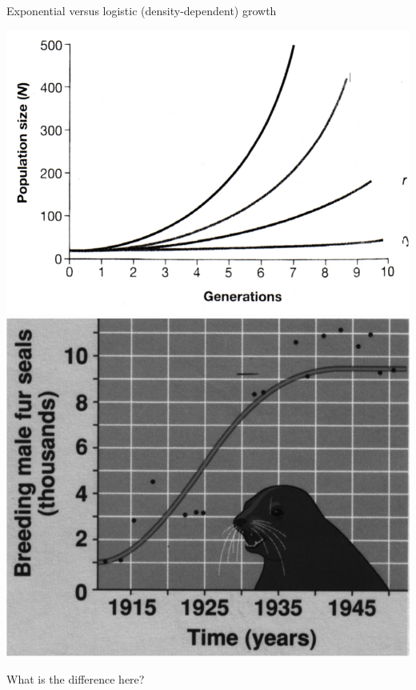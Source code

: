 \begin{frame}[t]
    \begin{adjustwidth}{-2em}{-1.5em}
        Exponential versus logistic (density-dependent) growth

        \begin{center}
        \includegraphics[height=0.5\textheight]{exp-growth-curves.png}
        \includegraphics[height=0.5\textheight]{seal-pop-growth.png}
        \end{center}

        What is the difference here?


    \end{adjustwidth}
\end{frame}

